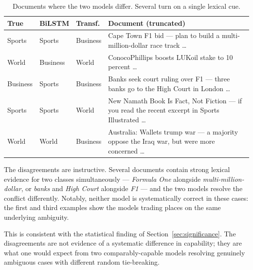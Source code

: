 \begin{table}[ht]
\centering
\caption[Documents on which the models disagree]{Documents where the two models differ. Several
turn on a single lexical cue.}
\label{tab:disagree}
\begin{tabular}{lllp{5.4cm}}
\toprule
\textbf{True} & \textbf{BiLSTM} & \textbf{Transf.} & \textbf{Document (truncated)} \\
\midrule
Sports   & Sports   & Business & Cape Town F1 bid --- plan to build a multi-million-dollar race track \ldots \\
World    & Business & World    & ConocoPhillips boosts LUKoil stake to 10 percent \ldots \\
Business & Sports   & Business & Banks seek court ruling over F1 --- three banks go to the High Court in London \ldots \\
Sports   & Sports   & World    & New Namath Book Is Fact, Not Fiction --- if you read the recent excerpt in Sports Illustrated \ldots \\
World    & World    & Business & Australia: Wallets trump war --- a majority oppose the Iraq war, but were more concerned \ldots \\
\bottomrule
\end{tabular}
\end{table}

The disagreements are instructive. Several documents contain strong lexical evidence for two
classes simultaneously --- \emph{Formula One} alongside \emph{multi-million-dollar}, or
\emph{banks} and \emph{High Court} alongside \emph{F1} --- and the two models resolve the conflict
differently. Notably, neither model is systematically correct in these cases: the first and third
examples show the models trading places on the same underlying ambiguity.

This is consistent with the statistical finding of Section~\ref{sec:significance}. The disagreements
are not evidence of a systematic difference in capability; they are what one would expect from two
comparably-capable models resolving genuinely ambiguous cases with different random tie-breaking.

